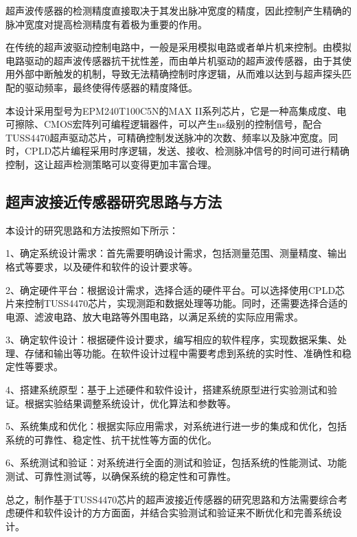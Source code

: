     超声波传感器的检测精度直接取决于其发出脉冲宽度的精度，因此控制产生精确的脉冲宽度对提高检测精度有着极为重要的作用。\par
    在传统的超声波驱动控制电路中，一般是采用模拟电路或者单片机来控制。由模拟电路驱动的超声波传感器抗干扰性差，而由单片机驱动的超声波传感器，由于其使用外部中断触发的机制，导致无法精确控制时序逻辑，从而难以达到与超声探头匹配的驱动频率，最终使得传感器的精度降低。\par
    本设计采用型号为EPM240T100C5N的MAX II系列芯片，它是一种高集成度、电可擦除、CMOS宏阵列可编程逻辑器件，可以产生ns级别的控制信号，配合TUSS4470超声驱动芯片，可精确控制发送脉冲的次数、频率以及脉冲宽度。同时，CPLD芯片编程采用时序逻辑，发送、接收、检测脉冲信号的时间可进行精确控制，这让超声检测策略可以变得更加丰富合理。
    
    \subsection{超声波接近传感器研究思路与方法}
    本设计的研究思路和方法按照如下所示：\par
   1、确定系统设计需求：首先需要明确设计需求，包括测量范围、测量精度、输出格式等要求，以及硬件和软件的设计要求等。

2、确定硬件平台：根据设计需求，选择合适的硬件平台。可以选择使用CPLD芯片来控制TUSS4470芯片，实现测距和数据处理等功能。同时，还需要选择合适的电源、滤波电路、放大电路等外围电路，以满足系统的实际应用需求。

3、确定软件设计：根据硬件设计要求，编写相应的软件程序，实现数据采集、处理、存储和输出等功能。在软件设计过程中需要考虑到系统的实时性、准确性和稳定性等要求。

4、搭建系统原型：基于上述硬件和软件设计，搭建系统原型进行实验测试和验证。根据实验结果调整系统设计，优化算法和参数等。

5、系统集成和优化：根据实际应用需求，对系统进行进一步的集成和优化，包括系统的可靠性、稳定性、抗干扰性等方面的优化。

6、系统测试和验证：对系统进行全面的测试和验证，包括系统的性能测试、功能测试、可靠性测试等，以确保系统的稳定性和可靠性。\par

总之，制作基于TUSS4470芯片的超声波接近传感器的研究思路和方法需要综合考虑硬件和软件设计的方方面面，并结合实验测试和验证来不断优化和完善系统设计。